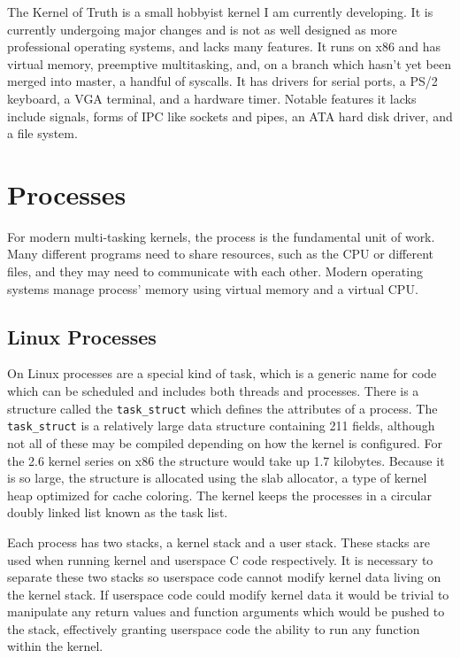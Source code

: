 \documentclass[10pt,conference,draftclsnofoot,onecolumn]{IEEEtran}
\begin{document}
The Kernel of Truth is a small hobbyist kernel I am currently developing. It is currently undergoing major changes and is not as well designed as more professional operating systems, and lacks many features. It runs on x86 and has virtual memory, preemptive multitasking, and, on a branch which hasn't yet been merged into master, a handful of syscalls. It has drivers for serial ports, a PS/2 keyboard, a VGA terminal, and a hardware timer. Notable features it lacks include signals, forms of IPC like sockets and pipes, an ATA hard disk driver, and a file system\cite{4_kronquist_2016}.

\section{Processes}
For modern multi-tasking kernels, the process is the fundamental unit of work.
Many different programs need to share resources, such as the CPU or different files, and they may need to communicate with each other. Modern operating systems manage process' memory using virtual memory and a virtual CPU.

\subsection{Linux Processes}
On Linux processes are a special kind of task, which is a generic name for code which can be scheduled and includes both threads and processes. There is a structure called the \texttt{task\_struct} which defines the attributes of a process. The \texttt{task\_struct} is a relatively large data structure containing 211 fields, although not all of these may be compiled depending on how the kernel is configured. For the 2.6 kernel series on x86 the structure would take up 1.7 kilobytes. Because it is so large, the structure is allocated using the slab allocator, a type of kernel heap optimized for cache coloring. The kernel keeps the processes in a circular doubly linked list known as the task list.

Each process has two stacks, a kernel stack and a user stack. These stacks are used when running kernel and userspace C code respectively. It is necessary to separate these two stacks so userspace code cannot modify kernel data living on the kernel stack. If userspace code could modify kernel data it would be trivial to manipulate any return values and function arguments which would be pushed to the stack, effectively granting userspace code the ability to run any function within the kernel.
\end{document}
